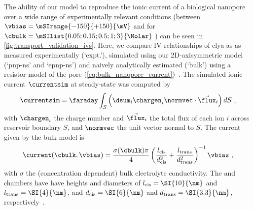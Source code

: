 The ability of our model to reproduce the ionic current of a biological nanopore over a wide range of
experimentally relevant conditions (between $\vbias = \mSIrange{-150}{+150}{\mV}$ and for $\cbulk =
\mSIlist{0.05;0.15;0.5;1;3}{\Molar}$ ) can be seen in \cref{fig:transport_validation_ivs}. Here, we
compare IV relationships of \gls{clya-as} as measured experimentally (`expt.'), simulated using our
2D-axisymmetric model (`\gls{pnp-ns}' and `\gls{epnp-ns}') and naively analytically estimated (`bulk') using a
resistor model of the pore (\cref{eq:bulk_nanopore_current})~\cite{Soskine-2013,Kowalczyk-2011}. The simulated
ionic current $\currentsim$ at steady-state was computed by
%
\begin{align}\label{eq:currentsim}
  \currentsim = \faraday\int_{S}\left(\dsum_{i}\chargen_{i}\normvec\cdot\vec{\flux}_{i}\right)dS
  \text{ ,}
\end{align}
%
with $\chargen_{i}$ the charge number and $\vec{\flux}_{i}$ the total flux of each ion $i$ across \cisi{}
reservoir boundary $S$, and $\normvec$ the unit vector normal to $S$. The current given by the bulk model is
%
\begin{align}\label{eq:bulk_nanopore_current}
  \current(\cbulk,\vbias) = 
      \dfrac{\sigma (\cbulk) \pi}{4}
      \left( 
          \dfrac{ l_{\text{cis}} }{ d_{\text{cis}}^2 } +
          \dfrac{ l_{\text{trans}} }{ d_{\text{trans}}^2 }
      \right)^{-1}
      \vbias
      \text{ ,}
\end{align}
%
with $\sigma$ the (concentration dependent) bulk electrolyte conductivity. The \cisi{} and \transi{} chambers
have have heights and diameters of $l_{\text{cis}}=\text{\SI{10}{\nm}}$ and
$l_{\text{trans}}=\text{\SI{4}{\nm}}$, and $d_{\text{cis}}=\text{\SI{6}{\nm}}$ and
$d_{\text{trans}}=\text{\SI{3.3}{\nm}}$, respectively~\cite{Soskine-2013}.


